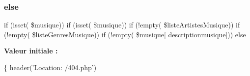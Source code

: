 \subsubsection{\texorpdfstring{else}{else}}
{\footnotesize\ttfamily if (isset( \$musique)) if (isset( \$musique)) if (!empty( \$liste\+Artistes\+Musique)) if (!empty( \$liste\+Genres\+Musique)) if (!empty( \$musique\mbox{[} \textquotesingle{}descriptionmusique\textquotesingle{}\mbox{]})) else}

{\bfseries Valeur initiale \+:}
\begin{DoxyCode}
\{
    header(\textcolor{stringliteral}{'Location: /404.php'})
\end{DoxyCode}
